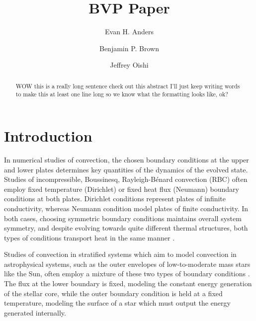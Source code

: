 \documentclass[aps, pre, onecolumn, nofootinbib, notitlepage, groupedaddress, amsfonts, amssymb, amsmath, longbibliography]{revtex4-1}
\newcommand{\RB}{Rayleigh-B\'{e}nard }
\begin{document}
\author{Evan H. Anders}
\author{Benjamin P. Brown}
\author{Jeffrey Oishi}
\title{BVP Paper}

\begin{abstract}
WOW this is a really long sentence check out this abstract I'll just keep writing words to make this at least
one line long so we know what the formatting looks like, ok?
\end{abstract}
\maketitle


\section{Introduction}
\label{sec:intro}
In numerical studies of convection, the chosen boundary conditions at the upper and lower plates
determines key quantities of the dynamics of the evolved state.
Studies of incompressible, Boussinesq, \RB convection (RBC) often
employ fixed temperature (Dirichlet) or fixed heat flux
(Neumann) boundary conditions at both plates.  
Dirichlet conditions represent plates of infinite conductivity,
whereas Neumann condition model plates of finite conductivity.  
In both cases, choosing symmetric boundary conditions maintains overall system symmetry, 
and despite evolving towards quite different thermal structures, both types of conditions
transport heat in the same manner \cite{johnston&doering2009}.

Studies of convection in stratified systems which aim to model convection 
in astrophysical systems, such as the outer envelopes of low-to-moderate mass stars 
like the Sun, often employ a mixture of these
two types of boundary conditions \cite{hurlburt&all1984, cattaneo&all1991}.  
The flux at the lower boundary is fixed, modeling
the constant energy generation of the stellar core, 
while the outer boundary condition is held at a fixed temperature,
modeling the surface of a star which must output the energy generated internally.
\end{document}

